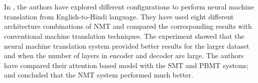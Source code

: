 \\\\
In \cite{saini2018neural}, the authors have explored different configurations to perform neural machine translation from English-to-Hindi language. They have used eight different architecture combinations of NMT and compared the corresponding results with conventional machine translation techniques. The experiment showed that the neural machine translation system provided better results for the larger dataset and when the number of layers in encoder and decoder are large. The authors have compared their attention based model with the SMT and PBMT systems; and concluded that the NMT system performed much better.